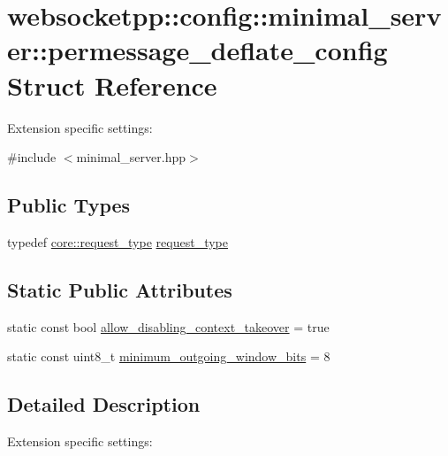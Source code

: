 \hypertarget{structwebsocketpp_1_1config_1_1minimal__server_1_1permessage__deflate__config}{}\section{websocketpp\+:\+:config\+:\+:minimal\+\_\+server\+:\+:permessage\+\_\+deflate\+\_\+config Struct Reference}
\label{structwebsocketpp_1_1config_1_1minimal__server_1_1permessage__deflate__config}


Extension specific settings\+:  




{\ttfamily \#include $<$minimal\+\_\+server.\+hpp$>$}

\subsection*{Public Types}
\begin{DoxyCompactItemize}
\item 
typedef \hyperlink{structwebsocketpp_1_1config_1_1core_a6b17eee7cb81f247afc8f3d7b3a3fc9e}{core\+::request\+\_\+type} \hyperlink{structwebsocketpp_1_1config_1_1minimal__server_1_1permessage__deflate__config_a3011304a1e8bf6893f946bfd41e967f6}{request\+\_\+type}
\end{DoxyCompactItemize}
\subsection*{Static Public Attributes}
\begin{DoxyCompactItemize}
\item 
static const bool \hyperlink{structwebsocketpp_1_1config_1_1minimal__server_1_1permessage__deflate__config_a6e01239ebe19410d4214db6bd1b83d53}{allow\+\_\+disabling\+\_\+context\+\_\+takeover} = true
\item 
static const uint8\+\_\+t \hyperlink{structwebsocketpp_1_1config_1_1minimal__server_1_1permessage__deflate__config_a6faed3e781638f77c451d003578d5ca2}{minimum\+\_\+outgoing\+\_\+window\+\_\+bits} = 8
\end{DoxyCompactItemize}


\subsection{Detailed Description}
Extension specific settings\+: 

